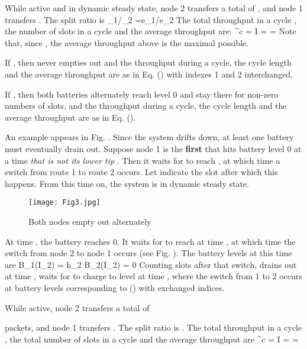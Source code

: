 \documentclass[12 pt]{article}
\newcommand{\debug}[1]{\mbox{\tt #1}}
\renewcommand{\debug}[1]{}              \newcommand{\cmd}[1]{}
\newcommand{\EE}[1]{ \debug{\fbox{\sname #1}}\label{\sname #1} \cmd{EAB}}
\begin{document}
While active and in dynamic steady state, node 2 transfers a total of
 , and node 1 transfers
.  The split ratio is
\SB
\gamma_1/\gamma_2 =e_1/e_2
\SE
The total throughput in a cycle , the number of slots in a cycle  and the average throughput  are:
\EB
\gamma^c = \text {   ;   }
I = \text{   ;    }
\gamma =  
\EE{eq-cycle}
Note that, since , the average throughput above is the maximal possible.



If   , then  never empties out and the throughput during a cycle, the cycle length and the average throughput are as in Eq. () with indexes 1 and 2 interchanged.
\LE


If   , then both batteries alternately reach level 0 and stay there for non-zero numbers of slots, and the throughput during a cycle, the cycle length and the average throughput are as in Eq. ().
\LE

\PB
An example appears in Fig. .
Since the system drifts down, at least one battery must eventually drain out.  Suppose node 1 is the \textbf{first} that hits battery level 0 at a time \emph{that is not its lower tip} .  Then it waits for  to reach , at which time a switch from route 1 to route 2 occurs.  Let  indicate the slot after which this happens.  From this time on, the system is in dynamic steady state.

\begin{figure}[hbtp]
\begin{center}
\texttt{[image: Fig3.jpg]}
\caption{Both nodes empty out alternately\debug{\fbox{fig-case2}}\label{fig-case2}}
\end{center}
\end{figure}

At time , the battery  reaches 0.  It waits for  to reach  at time , at which time the switch from node 2 to node 1 occurs (see Fig. ).  The battery levels at this time are
\EB
B_1(I_2) = h_2\text{      ;      } B_2(I_2) =  0
\EE{eq-bat3}
Counting slots after that switch,  drains out at time , waits for  to charge to level  at time , where the switch from 1 to 2 occurs at battery levels corresponding to () with  exchanged indices.

While active, node 2 transfers a total of

packets, and node 1 transfers
.  The split ratio is
.
The total throughput in a cycle , the total number of slots in a cycle  and the average throughput  are
\EB
\gamma^c = \text{    ;    }
I = \text{    ;    }
\gamma  =   
\EE{eq-cycle1}
\end{document}
